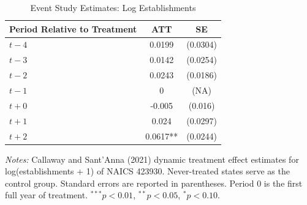\begin{table}[htbp]
\centering
\caption{Event Study Estimates: Log Establishments}
\label{tab:eventstudy}
\begin{threeparttable}
\begin{tabular}{lcc}
\toprule
Period Relative to Treatment & ATT & SE \\
\midrule
$t-4$ & 0.0199 & (0.0304) \\
$t-3$ & 0.0142 & (0.0254) \\
$t-2$ & 0.0243 & (0.0186) \\
$t-1$ & 0 & (NA) \\
$t+0$ & -0.005 & (0.016) \\
$t+1$ & 0.024 & (0.0297) \\
$t+2$ & 0.0617** & (0.0244) \\
\bottomrule
\end{tabular}
\begin{tablenotes}[flushleft]
\small
\item \textit{Notes:} Callaway and Sant'Anna (2021) dynamic treatment effect estimates for log(establishments + 1) of NAICS 423930. Never-treated states serve as the control group. Standard errors are reported in parentheses. Period 0 is the first full year of treatment. $^{***}p<0.01$, $^{**}p<0.05$, $^{*}p<0.10$.
\end{tablenotes}
\end{threeparttable}
\end{table}

